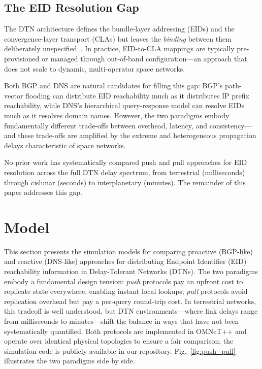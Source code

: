 \documentclass[journal,twocolumn]{IEEEtran}
\begin{document}
\subsection{The EID Resolution Gap}
\label{sec_eid_gap}

The DTN architecture defines the bundle-layer addressing (EIDs) and the convergence-layer transport (CLAs) but leaves the \emph{binding} between them deliberately unspecified~\cite{rfc4838}. In practice, EID-to-CLA mappings are typically pre-provisioned or managed through out-of-band configuration---an approach that does not scale to dynamic, multi-operator space networks.

Both BGP and DNS are natural candidates for filling this gap: BGP's path-vector flooding can distribute EID reachability much as it distributes IP prefix reachability, while DNS's hierarchical query-response model can resolve EIDs much as it resolves domain names. However, the two paradigms embody fundamentally different trade-offs between overhead, latency, and consistency---and these trade-offs are amplified by the extreme and heterogeneous propagation delays characteristic of space networks.

No prior work has systematically compared push and pull approaches for EID resolution across the full DTN delay spectrum, from terrestrial (milliseconds) through cislunar (seconds) to interplanetary (minutes). The remainder of this paper addresses this gap.

\section{Model}
\label{sec_model}

This section presents the simulation models for comparing proactive (BGP-like) and reactive (DNS-like) approaches for distributing Endpoint Identifier (EID) reachability information in Delay-Tolerant Networks (DTNs). 
The two paradigms embody a fundamental design tension: \emph{push} protocols pay an upfront cost to replicate state everywhere, enabling instant local lookups; \emph{pull} protocols avoid replication overhead but pay a per-query round-trip cost. 
In terrestrial networks, this tradeoff is well understood, but DTN environments---where link delays range from milliseconds to minutes---shift the balance in ways that have not been systematically quantified. 
Both protocols are implemented in OMNeT++\cite{varga2010omnet} and operate over identical physical topologies to ensure a fair comparison; the simulation code is publicly available in our repository\cite{darksol_bgp_dns_omnetpp_2026}.
Fig.~\ref{fig:push_pull} illustrates the two paradigms side by side.
\end{document}
